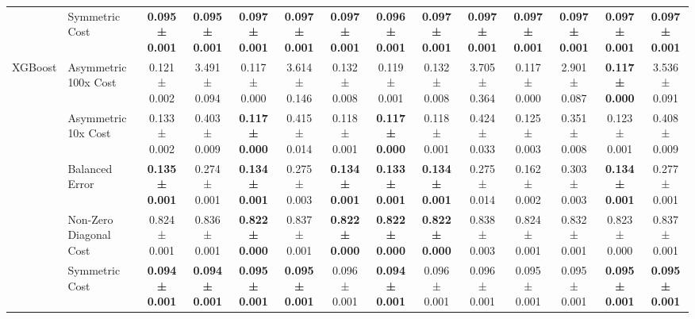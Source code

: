 \begin{table}[H]
{\begin{tabular}{llcccccccccccc}
 & Symmetric Cost & \textbf{0.095 ± 0.001} & \textbf{0.095 ± 0.001} & \textbf{0.097 ± 0.001} & \textbf{0.097 ± 0.001} & \textbf{0.097 ± 0.001} & \textbf{0.096 ± 0.001} & \textbf{0.097 ± 0.001} & \textbf{0.097 ± 0.001} & \textbf{0.097 ± 0.001} & \textbf{0.097 ± 0.001} & \textbf{0.097 ± 0.001} & \textbf{0.097 ± 0.001} \\
\cline{1-14}
\multirow[t]{5}{*}{XGBoost} & Asymmetric 100x Cost & 0.121 ± 0.002 & 3.491 ± 0.094 & 0.117 ± 0.000 & 3.614 ± 0.146 & 0.132 ± 0.008 & 0.119 ± 0.001 & 0.132 ± 0.008 & 3.705 ± 0.364 & 0.117 ± 0.000 & 2.901 ± 0.087 & \textbf{0.117 ± 0.000} & 3.536 ± 0.091 \\
 & Asymmetric 10x Cost & 0.133 ± 0.002 & 0.403 ± 0.009 & \textbf{0.117 ± 0.000} & 0.415 ± 0.014 & 0.118 ± 0.001 & \textbf{0.117 ± 0.000} & 0.118 ± 0.001 & 0.424 ± 0.033 & 0.125 ± 0.003 & 0.351 ± 0.008 & 0.123 ± 0.001 & 0.408 ± 0.009 \\
 & Balanced Error & \textbf{0.135 ± 0.001} & 0.274 ± 0.001 & \textbf{0.134 ± 0.001} & 0.275 ± 0.003 & \textbf{0.134 ± 0.001} & \textbf{0.133 ± 0.001} & \textbf{0.134 ± 0.001} & 0.275 ± 0.014 & 0.162 ± 0.002 & 0.303 ± 0.003 & \textbf{0.134 ± 0.001} & 0.277 ± 0.001 \\
 & Non-Zero Diagonal Cost & 0.824 ± 0.001 & 0.836 ± 0.001 & \textbf{0.822 ± 0.000} & 0.837 ± 0.001 & \textbf{0.822 ± 0.000} & \textbf{0.822 ± 0.000} & \textbf{0.822 ± 0.000} & 0.838 ± 0.003 & 0.824 ± 0.001 & 0.832 ± 0.001 & 0.823 ± 0.000 & 0.837 ± 0.001 \\
 & Symmetric Cost & \textbf{0.094 ± 0.001} & \textbf{0.094 ± 0.001} & \textbf{0.095 ± 0.001} & \textbf{0.095 ± 0.001} & 0.096 ± 0.001 & \textbf{0.094 ± 0.001} & 0.096 ± 0.001 & 0.096 ± 0.001 & 0.095 ± 0.001 & 0.095 ± 0.001 & \textbf{0.095 ± 0.001} & \textbf{0.095 ± 0.001} \\
\cline{1-14}
\bottomrule
\end{tabular}
    }
\end{table}
